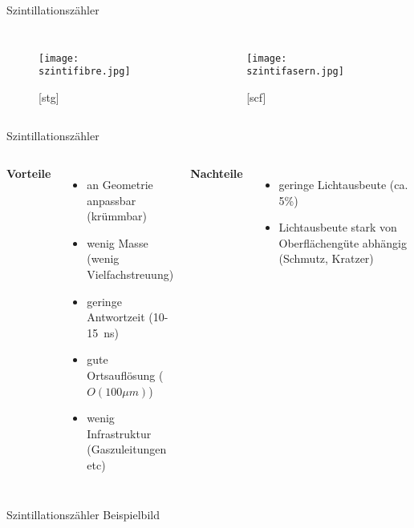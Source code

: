 \begin{frame}{Szintillationszähler}
		\begin{columns}[T]
			\begin{figure}[htbp]
			  \centering
			  \texttt{[image: szintifibre.jpg]}
			  \caption*{[stg]}
			\end{figure}
	    	\begin{figure}[htbp]
			  \centering
			  \texttt{[image: szintifasern.jpg]}
			  \caption*{[scf]}
			\end{figure}
    \end{columns}
\end{frame}
	
	\begin{frame}{Szintillationszähler}
    \begin{columns}[T]
			\textbf{Vorteile}		
			\vspace{0.7cm}
			\begin{itemize}
			  \item an Geometrie anpassbar (krümmbar)
			  \item wenig Masse (wenig Vielfachstreuung)
			  \item geringe Antwortzeit (10-15~ns)
			  \item gute Ortsauflösung ($O(100\mu m)$)
			  \item wenig Infrastruktur (Gaszuleitungen etc)
			\end{itemize}	
	    	\textbf{Nachteile}
	    	\vspace{0.7cm}
	    	\begin{itemize}
			  \item geringe Lichtausbeute (ca. 5\%)
			  \item Lichtausbeute stark von Oberflächengüte abhängig (Schmutz, Kratzer)
			\end{itemize}
    \end{columns}
\end{frame}

\begin{frame}{Szintillationszähler}
Beispielbild
\end{frame}

